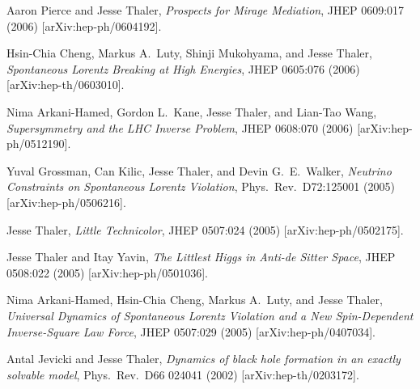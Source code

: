 \begin{list}{[]\addtocounter{jessecount}{-1}}{\leftmargin=3em \itemsep=4pt}
\item
 Aaron Pierce and Jesse Thaler,
\emph{Prospects for Mirage Mediation},
JHEP 0609:017 (2006)
[arXiv:hep-ph/0604192].

\item
 Hsin-Chia Cheng, Markus A.\ Luty, Shinji Mukohyama, and Jesse Thaler,
\emph{Spontaneous Lorentz Breaking at High Energies},
JHEP 0605:076 (2006)
[arXiv:hep-th/0603010].

\item
 Nima Arkani-Hamed, Gordon L.\ Kane, Jesse Thaler, and Lian-Tao Wang,
\emph{Supersymmetry and the LHC Inverse Problem},
JHEP 0608:070 (2006)
[arXiv:hep-ph/0512190].

\item
 Yuval Grossman, Can Kilic, Jesse Thaler, and Devin G.\ E.\ Walker,
\emph{Neutrino Constraints on Spontaneous Lorentz Violation},
Phys.\ Rev.\ D72:125001 (2005)
[arXiv:hep-ph/0506216].

\item
 Jesse Thaler,
\emph{Little Technicolor},
JHEP 0507:024 (2005)
[arXiv:hep-ph/0502175].

\item
 Jesse Thaler and Itay Yavin,
\emph{The Littlest Higgs in Anti-de Sitter Space},
JHEP 0508:022 (2005)
[arXiv:hep-ph/0501036].

\item
 Nima Arkani-Hamed, Hsin-Chia Cheng, Markus A.\ Luty, and Jesse Thaler,
\emph{Universal Dynamics of Spontaneous Lorentz Violation and a New Spin-Dependent Inverse-Square Law Force},
JHEP 0507:029 (2005)
[arXiv:hep-ph/0407034].

\item
 Antal Jevicki and Jesse Thaler,
\emph{Dynamics of black hole formation in an exactly solvable model},
Phys.\ Rev.\ D66 024041 (2002)
[arXiv:hep-th/0203172].

\end{list}
